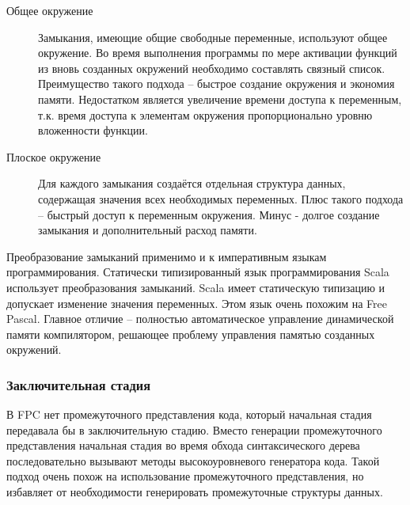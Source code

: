 \documentclass{imcs}
\begin{document}
\begin{description}
    \item[Общее окружение] Замыкания, имеющие общие свободные переменные,
используют общее окружение. Во время выполнения программы по мере активации функций
из вновь созданных окружений необходимо составлять связный список.
Преимущество такого подхода -- быстрое создание окружения и экономия памяти. Недостатком
является увеличение времени доступа к переменным, т.к. время доступа к элементам
окружения пропорционально уровню вложенности функции.
    \item[Плоское окружение] Для каждого замыкания создаётся отдельная структура данных,
содержащая значения всех необходимых переменных. Плюс такого подхода -- быстрый доступ
к переменным окружения. Минус - долгое создание замыкания и дополнительный расход памяти.
\end{description}

\fi

Преобразование замыканий применимо и к императивным языкам
программирования. Статически типизированный язык программирования Scala
использует преобразования замыканий\cite{scalaoverview}\cite{scalaclosure}.
Scala имеет статическую типизацию и допускает изменение значения переменных. Этом
язык очень похожим на Free Pascal. Главное отличие -- полностью автоматическое
управление динамической памяти компилятором, решающее проблему управления памятью
созданных окружений.

\subsubsection{Заключительная стадия}

В FPC нет промежуточного представления кода, который начальная стадия
передавала бы в заключительную стадию. Вместо генерации промежуточного представления
начальная стадия во время обхода синтаксического дерева последовательно вызывают методы
высокоуровневого генератора кода. Такой подход очень похож на использование
промежуточного представления, но избавляет от необходимости генерировать промежуточные
структуры данных.

\end{document}

